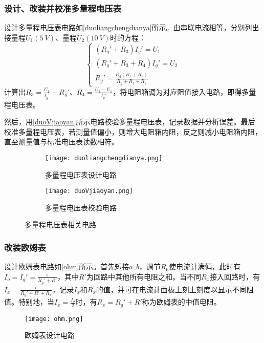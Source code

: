 \documentclass[yuxi]{../template/Preport}
\begin{document}
\subsubsection{设计、改装并校准多量程电压表}
    设计多量程电压表电路如\autoref{duoliangchengdianya}所示。由串联电流相等，分别列出接量程$U_1(\SI{5}{V})$、量程$U_2(\SI{10}{V})$时的方程：
    \begin{equation}
        \begin{cases}
            (R_g'+R_3)I_g' = U_1\\
            (R_g'+R_3+R_4)I_g' = U_2\\
            R_g' = \frac{R_g(R_1+R_2)}{R_g+R_1+R_2}
        \end{cases}
    \end{equation}
    计算出$R_3=\frac{U_1}{I_g'}-R_g'$、$R_4 = \frac{U_2-U_1}{I_g'}$，将电阻箱调为对应阻值接入电路，即得多量程电压表。

    然后，用\autoref{duoVjiaoyan}所示电路校验多量程电压表，记录数据并分析误差。最后校准多量程电压表，若测量值偏小，则增大电阻箱内阻，反之则减小电阻箱内阻，直至测量值与标准电压表读数相符。
    \begin{figure}[htbp]
        \centering
        \begin{subfigure}[b]{0.45\textwidth}
            \texttt{[image: duoliangchengdianya.png]}
            \caption{多量程电压表设计电路}
            \label{duoliangchengdianya}
        \end{subfigure}
        \hfill
        \begin{subfigure}[b]{0.45\textwidth}
            \texttt{[image: duoVjiaoyan.png]}
            \caption{多量程电压表校验电路}
            \label{duoVjiaoyan}
        \end{subfigure}
        \caption{多量程电压表相关电路}
    \end{figure}

\subsubsection{改装欧姆表}
    设计欧姆表电路如\autoref{ohm}所示。首先短接$a,b$，调节$R_6$使电流计满偏，此时有$I_o = I_g' = \frac{\epsilon}{R_g'+R'}$，其中$R'$为回路中其他所有电阻之和。当不同$R_x$接入回路时，有$I_x = \frac{\epsilon}{R_g'+R'+R_x}$，记录$I_x$和$R_x$的值，并可在电流计面板上刻上刻度以显示不同阻值。特别地，当$I_x=\frac{I_o}{2}$时，有$R_x = R_g' + R'$称为欧姆表的中值电阻。
    \begin{figure}[htbp]
        \centering
        \texttt{[image: ohm.png]}
        \caption{欧姆表设计电路}
        \label{ohm}
    \end{figure}
\end{document}
